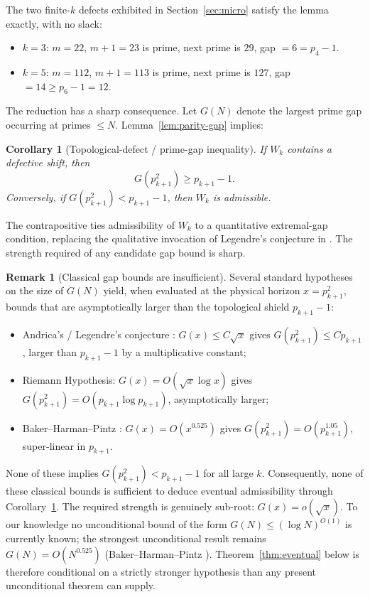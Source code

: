 \documentclass{iopjournal}
\newtheorem{corollary}{Corollary}
\theoremstyle{definition}
\newtheorem{remark}{Remark}
\begin{document}
The two finite-$k$ defects exhibited in Section~\ref{sec:micro} satisfy
the lemma exactly, with no slack:
\begin{itemize}
\item $k = 3$: $m = 22$, $m + 1 = 23$ is prime, next prime is $29$, gap $= 6 = p_4 - 1$.
\item $k = 5$: $m = 112$, $m + 1 = 113$ is prime, next prime is $127$, gap $= 14 \geq p_6 - 1 = 12$.
\end{itemize}

The reduction has a sharp consequence. Let $G(N)$ denote the largest
prime gap occurring at primes $\leq N$. Lemma~\ref{lem:parity-gap}
implies:

\begin{corollary}[Topological-defect / prime-gap inequality]
\label{cor:gap-inequality}
If $W_k$ contains a defective shift, then
\[
    G(p_{k+1}^2) \geq p_{k+1} - 1.
\]
Conversely, if $G(p_{k+1}^2) < p_{k+1} - 1$, then $W_k$ is admissible.
\end{corollary}

The contrapositive ties admissibility of $W_k$ to a quantitative
extremal-gap condition, replacing the qualitative invocation of
Legendre's conjecture in \cite{wang2026emergence}. The strength
required of any candidate gap bound is sharp.

\begin{remark}[Classical gap bounds are insufficient]
\label{rem:classical-insufficient}
Several standard hypotheses on the size of $G(N)$ yield, when evaluated
at the physical horizon $x = p_{k+1}^2$, bounds that are
asymptotically larger than the topological shield $p_{k+1} - 1$:
\begin{itemize}
\item Andrica's / Legendre's conjecture \cite{andrica1986conjecture}: $G(x) \leq C \sqrt{x}$ gives
      $G(p_{k+1}^2) \leq C p_{k+1}$, larger than $p_{k+1} - 1$ by a
      multiplicative constant;
\item Riemann Hypothesis: $G(x) = O(\sqrt{x} \log x)$ gives
      $G(p_{k+1}^2) = O(p_{k+1} \log p_{k+1})$, asymptotically larger;
\item Baker--Harman--Pintz \cite{baker2001difference}:
      $G(x) = O(x^{0.525})$ gives $G(p_{k+1}^2) = O(p_{k+1}^{1.05})$,
      super-linear in $p_{k+1}$.
\end{itemize}
None of these implies $G(p_{k+1}^2) < p_{k+1} - 1$ for all large $k$.
Consequently, none of these classical bounds is sufficient to deduce
eventual admissibility through Corollary~\ref{cor:gap-inequality}.
The required strength is genuinely sub-root: $G(x) = o(\sqrt{x})$.
To our knowledge no unconditional bound of the form
$G(N) \leq (\log N)^{O(1)}$ is currently known; the strongest
unconditional result remains $G(N) = O(N^{0.525})$
(Baker--Harman--Pintz \cite{baker2001difference}). Theorem~\ref{thm:eventual}
below is therefore conditional on a strictly stronger hypothesis than
any present unconditional theorem can supply.
\end{remark}
\end{document}
